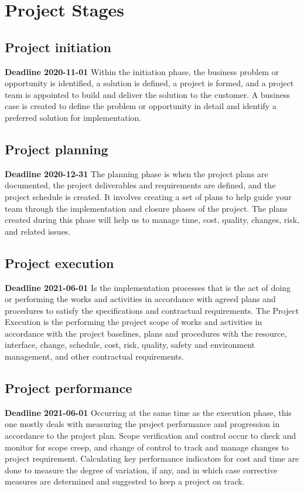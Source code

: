 \documentclass{VUMIFPSkursinis}
\begin{document}
		

\section{Project Stages}
	\subsection{Project initiation}
	\textbf{Deadline 2020-11-01}
	Within the initiation phase, the business problem or opportunity is identified, a solution is defined, a project is formed, and a project team is appointed to build and deliver the solution to the customer. A business case is created to define the problem or opportunity in detail and identify a preferred solution for implementation. 
	\subsection{Project planning}
	\textbf{Deadline 2020-12-31}
	The planning phase is when the project plans are documented, the project deliverables and requirements are defined, and the project schedule is created. It involves creating a set of plans to help guide your team through the implementation and closure phases of the project. The plans created during this phase will help us to manage time, cost, quality, changes, risk, and related issues.
	\subsection{Project execution}
	\textbf{Deadline 2021-06-01}
	Is the implementation processes that is the act of doing or performing the works and activities in accordance with agreed plans and procedures to satisfy the specifications and contractual requirements. The Project Execution is the performing the project scope of works and activities in accordance with the project baselines, plans and procedures with the resource, interface, change, schedule, cost, risk, quality, safety and environment management, and other contractual requirements.
	\subsection{Project performance} 
	\textbf{Deadline 2021-06-01}
	Occurring at the same time as the execution phase, this one mostly deals with measuring the project performance and progression in accordance to the project plan. Scope verification and control occur to check and monitor for scope creep, and change of control to track and manage changes to project requirement. Calculating key performance indicators for cost and time are done to measure the degree of variation, if any, and in which case corrective measures are determined and suggested to keep a project on track.
\end{document}
